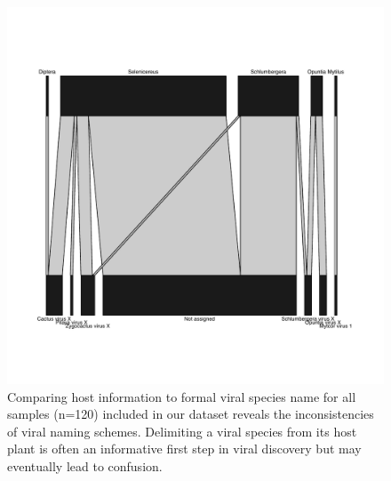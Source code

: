 \documentclass[fleqn,10pt,lineno]{wlpeerj}
\begin{document}
\newpage{}
 \begin{figure}[ht]
 \centering
 \includegraphics[width=1\linewidth]{figures/hostxformalname.pdf}
 \begin{NoHyper}
 \caption{
Comparing host information to formal viral species name for all samples (n=120) included in our dataset reveals the inconsistencies of viral naming schemes. Delimiting a viral species from its host plant is often an informative first step in viral discovery but may eventually lead to confusion.
}
 \label{fig:fig4}
 \end{NoHyper}
 \end{figure}




\end{document}
